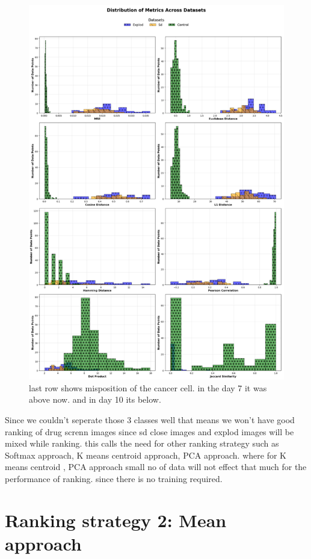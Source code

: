 \begin{figure}[H]
  \centering
  \includegraphics[scale=0.7]{figures/bargraph.pdf} 
  \caption{last row shows misposition of the cancer cell. in the day 7 it was above now. and in day 10 its below.}
  \label{fig:bargraph}
\end{figure}

Since we couldn't seperate those 3 classes well that means we won't have good ranking of drug screnn images since sd close images and explod images will be mixed while ranking. this calls the need for other ranking strategy such as Softmax approach, K means centroid approach, PCA approach. where for K means centroid , PCA approach small no of data will not effect that much for the performance of ranking. since there is no training required.

\section{Ranking strategy 2: Mean approach}


